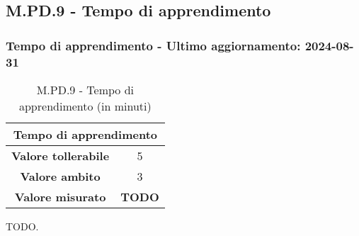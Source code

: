 \subsection{M.PD.9 - Tempo di apprendimento}

\subsubsection*{Tempo di apprendimento - Ultimo aggiornamento: 2024-08-31}

\begin{table}[H]
  \centering
  \begin{tabular}{|c|c|}
      \hline
      \multicolumn{2}{|c|}{Tempo di apprendimento} \\
      \hline
      \textbf{Valore tollerabile} & 5 \\
      \hline
      \textbf{Valore ambito} & 3 \\
      \hline
      \textbf{Valore misurato} & \textbf{TODO} \\
      \hline
  \end{tabular}
  \caption{M.PD.9 - Tempo di apprendimento (in minuti)}
\end{table}

\par TODO.